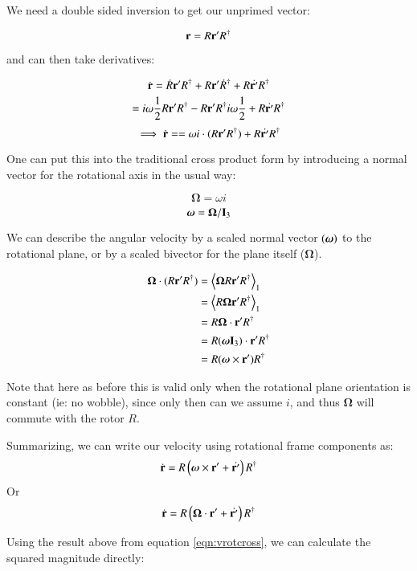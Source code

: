 \documentclass{article}      %
\newcommand{\dt}[1]{\dot{#1}}
\newcommand{\gpgradeone}[1] {{\left\langle{{#1}}\right\rangle}_{1}}
\newcommand{\BOmega}[0]{\boldsymbol{\Omega}}
\begin{document}
We need a double sided inversion to get our unprimed vector:

\[
\mathbf{r} = R \mathbf{r}' R^\dagger
\]

and can then take derivatives:

\[
\dt{\Br} = 
\dt{R} \Br' R^\dagger
+{R} {\Br'} \dt{R}^\dagger
+{R} \dt{\Br'} R^\dagger
\]
\[
= 
i\omega \inv{2} {R} \Br' R^\dagger
- {R} \Br' R^\dagger i\omega\inv{2}
+{R} \dt{\Br'} R^\dagger
\]
\begin{equation}\label{eqn:velocityfixedrotplane}
\implies
\dt{\Br} = 
= 
\omega i \cdot ({R} \Br' R^\dagger) +  {R} \dt{\Br'} R^\dagger
\end{equation}

One can put this into the traditional cross product form by introducing
a normal vector for the rotational axis in the usual way:

\[
\BOmega = \omega i
\]
\[
\Bomega = \BOmega / \BI_3
\]

We can describe the angular velocity by a scaled normal vector $(\boldsymbol{\omega})$ to the rotational plane, or by a scaled bivector for the plane itself ($\BOmega$).

\begin{align*}
\BOmega \cdot ({R} \Br' R^\dagger)
&= \gpgradeone{ \BOmega {R} \Br' R^\dagger } \\
&= \gpgradeone{ {R} \BOmega \Br' R^\dagger } \\
&= {R} \BOmega \cdot \Br' R^\dagger \\
&= {R} (\Bomega \BI_3) \cdot \Br' R^\dagger \\
&= {R} (\Bomega \cross \Br') R^\dagger \\
\end{align*}

Note that here as before this is valid only when the rotational plane orientation is constant (ie: no wobble), since only then can we assume $i$, and thus $\BOmega$ will commute with the rotor $R$.

Summarizing, we can write our velocity using rotational frame components
as: 
\begin{equation}\label{eqn:vrotcross}
\dt{\Br} = {R} \left( \Bomega \cross \Br' + \dt{\Br'} \right) R^\dagger
\end{equation}
Or
\begin{equation}
\dt{\Br} = {R} \left( \BOmega \cdot \Br' + \dt{\Br'} \right) R^\dagger
\end{equation}

Using the result above from equation \ref{eqn:vrotcross}, we can calculate
the squared magnitude directly:
\end{document}
